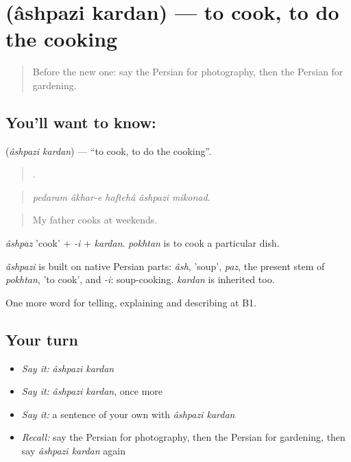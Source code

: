 \section[\texorpdfstring{\fa{آشپزی} \fa{کردن} (âshpazi kardan)}{آشپزی کردن (âshpazi kardan)}]{  (âshpazi kardan) — to cook, to do the cooking}

\label{lesson:FA-C507-ashpazi-kardan}



\begin{quote}
Before the new one: say the Persian for photography, then the Persian for gardening.
\end{quote}

\subsection*{You'll want to know:  }
\textbf{ } (\emph{âshpazi kardan}) — \textquotedblleft{}to cook, to do the cooking\textquotedblright{}.

\begin{quote}
     .
\end{quote}

\begin{quote}
\emph{pedaram âkhar-e haftehâ âshpazi mikonad.}
\end{quote}

\begin{quote}
My father cooks at weekends.
\end{quote}

\emph{âshpaz} 'cook' + \emph{-i} + \emph{kardan}. \emph{pokhtan} is to cook a particular dish.

\begin{cousinweb}
\emph{âshpazi} is built on native Persian parts: \emph{âsh}, 'soup', \emph{paz}, the present stem of \emph{pokhtan}, 'to cook', and \emph{-i}: soup-cooking. \emph{kardan} is inherited too.
\end{cousinweb}

\begin{grammarlens}[title={What you've built}]
One more word for telling, explaining and describing at B1.
\end{grammarlens}

\subsection*{Your turn}
\begin{itemize}
\raggedright
  \item \emph{Say it:} \emph{âshpazi kardan}
  \item \emph{Say it:} \emph{âshpazi kardan}, once more
  \item \emph{Say it:} a sentence of your own with \emph{âshpazi kardan}
  \item \emph{Recall:} say the Persian for photography, then the Persian for gardening, then say \emph{âshpazi kardan} again
\end{itemize}

